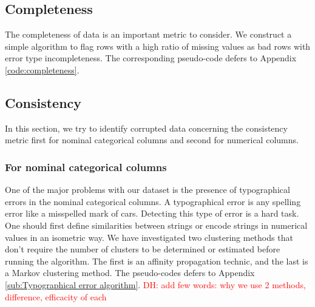 \documentclass{article}
\newcommand\dhawat[1]{\textcolor{red}{DH: #1}}
\begin{document}
\subsection{Completeness} %
\label{sub:Completeness}
The completeness of data is an important metric to consider.
We construct a simple algorithm to flag rows with a high ratio of missing values as bad rows with error type incompleteness.
The corresponding pseudo-code defers to Appendix \ref{code:completeness}.

\subsection{Consistency} %
\label{sub:consistency}
In this section, we try to identify corrupted data concerning the consistency metric first for nominal categorical columns and second for numerical columns.
\subsubsection{For nominal categorical columns}
One of the major problems with our dataset is the presence of typographical errors in the nominal categorical columns.
A typographical error is any spelling error like a misspelled mark of cars.
Detecting this type of error is a hard task.
One should first define similarities between strings or encode strings in numerical values in an isometric way.
We have investigated two clustering methods that don't require the number of clusters to be determined or estimated before running the algorithm.
The first is an affinity propagation technic, and the last is a Markov clustering method.
The pseudo-codes defers to Appendix \ref{sub:Typographical error algorithm}.
\dhawat{add few words: why we use 2 methods, difference, efficacity of each}
\end{document}
